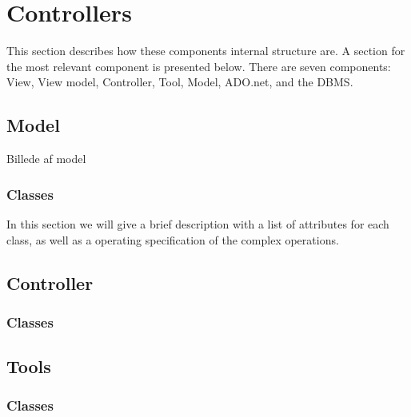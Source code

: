 \section{Controllers}

This section describes how these components internal structure are.
A section for the most relevant component is presented below.
There are seven components: View, View model, Controller, Tool, Model, ADO.net, and the DBMS. 



\subsection{Model}

Billede af model


\subsubsection{Classes}
In this section we will give a brief description with a list of attributes for each class, as well as a operating specification of the complex operations.



\subsection{Controller}

\subsubsection{Classes}




\subsection{Tools}

\subsubsection{Classes}